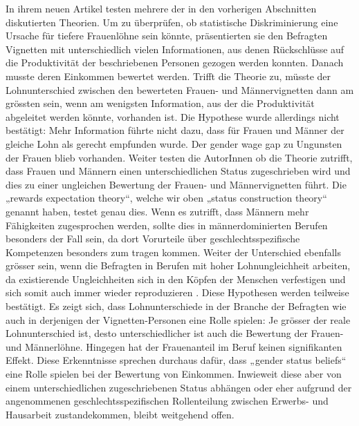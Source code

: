 \documentclass[a4paper,12pt]{article}
\begin{document}
In ihrem neuen Artikel testen \citet{Auspurg-etal-2017} mehrere der in den vorherigen Abschnitten diskutierten Theorien. Um zu überprüfen, ob statistische Diskriminierung eine Ursache für tiefere Frauenlöhne sein könnte, präsentierten sie den Befragten Vignetten mit unterschiedlich vielen Informationen, aus denen Rückschlüsse auf die Produktivität der beschriebenen Personen gezogen werden konnten. Danach musste deren Einkommen bewertet werden. Trifft die Theorie zu, müsste der Lohnunterschied zwischen den bewerteten Frauen- und Männervignetten dann am grössten sein, wenn am wenigsten Information, aus der die Produktivität abgeleitet werden könnte, vorhanden ist. Die Hypothese wurde allerdings nicht bestätigt: Mehr Information führte nicht dazu, dass für Frauen und Männer der gleiche Lohn als gerecht empfunden wurde. Der gender wage gap zu Ungunsten der Frauen blieb vorhanden.
Weiter testen die AutorInnen ob die Theorie zutrifft, dass Frauen und Männern einen unterschiedlichen Status zugeschrieben wird und dies zu einer ungleichen Bewertung der Frauen- und Männervignetten führt. Die „rewards expectation theory“, welche wir oben „status construction theory“ genannt haben, testet genau dies. Wenn es zutrifft, dass Männern mehr Fähigkeiten zugesprochen werden, sollte dies in männerdominierten Berufen besonders der Fall sein, da dort Vorurteile über geschlechtsspezifische Kompetenzen besonders zum tragen kommen. Weiter der Unterschied ebenfalls grösser sein, wenn die Befragten in Berufen mit hoher Lohnungleichheit arbeiten, da existierende Ungleichheiten sich in den Köpfen der Menschen verfestigen und sich somit auch immer wieder reproduzieren \citep[182]{Auspurg-etal-2017}. Diese Hypothesen werden teilweise bestätigt. Es zeigt sich, dass Lohnunterschiede in der Branche der Befragten wie auch in derjenigen der Vignetten-Personen eine Rolle spielen: Je grösser der reale Lohnunterschied ist, desto unterschiedlicher ist auch die Bewertung der Frauen- und Männerlöhne. Hingegen hat der Frauenanteil im Beruf keinen signifikanten Effekt. Diese Erkenntnisse sprechen durchaus dafür, dass „gender status beliefs“ eine Rolle spielen bei der Bewertung von Einkommen. Inwieweit diese aber von einem unterschiedlichen zugeschriebenen Status abhängen oder eher aufgrund der angenommenen geschlechtsspezifischen Rollenteilung zwischen Erwerbs- und Hausarbeit zustandekommen, bleibt weitgehend offen.
\end{document}
